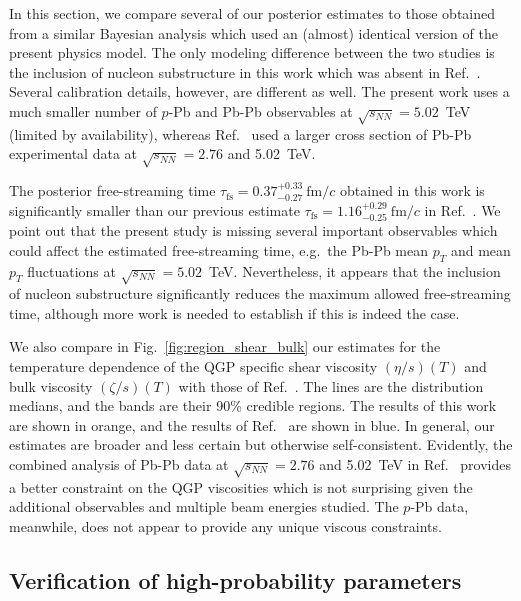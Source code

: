 \documentclass[aps,prc,reprint,amsmath,nofootinbib]{revtex4-1}
\newcommand{\sqrts}{\sqrt{s_{NN}}}
\newcommand{\fmc}{\ensuremath{\text{fm}/c}}
\newcommand{\taufs}{\tau_\text{fs}}
\begin{document}
In this section, we compare several of our posterior estimates to those obtained from a similar Bayesian analysis \cite{Bernhard:2018hnz} which used an (almost) identical version of the present physics model.
The only modeling difference between the two studies is the inclusion of nucleon substructure in this work which was absent in Ref.~\cite{Bernhard:2018hnz}.
Several calibration details, however, are different as well.
The present work uses a much smaller number of $p$-Pb and Pb-Pb observables at $\sqrts=5.02$~TeV (limited by availability), whereas Ref.~\cite{Bernhard:2018hnz} used a larger cross section of Pb-Pb experimental data at $\sqrts=2.76$ and 5.02~TeV.

The posterior free-streaming time $\taufs=0.37_{-0.27}^{+0.33}\ \fmc$ obtained in this work is significantly smaller than our previous estimate $\taufs=1.16_{-0.25}^{+0.29}\ \fmc$ in Ref.~\cite{Bernhard:2018hnz}.
We point out that the present study is missing several important observables which could affect the estimated free-streaming time, e.g.\ the Pb-Pb mean $p_T$ and mean $p_T$ fluctuations at $\sqrts=5.02$~TeV.
Nevertheless, it appears that the inclusion of nucleon substructure significantly reduces the maximum allowed free-streaming time, although more work is needed to establish if this is indeed the case.

We also compare in Fig.~\ref{fig:region_shear_bulk} our estimates for the temperature dependence of the QGP specific shear viscosity $(\eta/s)(T)$ and bulk viscosity $(\zeta/s)(T)$ with those of Ref.~\cite{Bernhard:2018hnz}.
The lines are the distribution medians, and the bands are their 90\% credible regions.
The results of this work are shown in orange, and the results of Ref.~\cite{Bernhard:2018hnz} are shown in blue.
In general, our estimates are broader and less certain but otherwise self-consistent.
Evidently, the combined analysis of Pb-Pb data at $\sqrts=2.76$ and 5.02~TeV in Ref.~\cite{Bernhard:2018hnz} provides a better constraint on the QGP viscosities which is not surprising given the additional observables and multiple beam energies studied.
The $p$-Pb data, meanwhile, does not appear to provide any unique viscous constraints.

\subsection{Verification of high-probability parameters}
\end{document}
